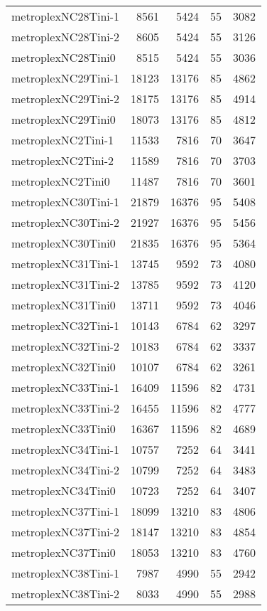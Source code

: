 \begin{tabular}{lrrrr}
metroplexNC28Tini-1 & 8561 & 5424 & 55 & 3082 \\
metroplexNC28Tini-2 & 8605 & 5424 & 55 & 3126 \\
metroplexNC28Tini0 & 8515 & 5424 & 55 & 3036 \\
metroplexNC29Tini-1 & 18123 & 13176 & 85 & 4862 \\
metroplexNC29Tini-2 & 18175 & 13176 & 85 & 4914 \\
metroplexNC29Tini0 & 18073 & 13176 & 85 & 4812 \\
metroplexNC2Tini-1 & 11533 & 7816 & 70 & 3647 \\
metroplexNC2Tini-2 & 11589 & 7816 & 70 & 3703 \\
metroplexNC2Tini0 & 11487 & 7816 & 70 & 3601 \\
metroplexNC30Tini-1 & 21879 & 16376 & 95 & 5408 \\
metroplexNC30Tini-2 & 21927 & 16376 & 95 & 5456 \\
metroplexNC30Tini0 & 21835 & 16376 & 95 & 5364 \\
metroplexNC31Tini-1 & 13745 & 9592 & 73 & 4080 \\
metroplexNC31Tini-2 & 13785 & 9592 & 73 & 4120 \\
metroplexNC31Tini0 & 13711 & 9592 & 73 & 4046 \\
metroplexNC32Tini-1 & 10143 & 6784 & 62 & 3297 \\
metroplexNC32Tini-2 & 10183 & 6784 & 62 & 3337 \\
metroplexNC32Tini0 & 10107 & 6784 & 62 & 3261 \\
metroplexNC33Tini-1 & 16409 & 11596 & 82 & 4731 \\
metroplexNC33Tini-2 & 16455 & 11596 & 82 & 4777 \\
metroplexNC33Tini0 & 16367 & 11596 & 82 & 4689 \\
metroplexNC34Tini-1 & 10757 & 7252 & 64 & 3441 \\
metroplexNC34Tini-2 & 10799 & 7252 & 64 & 3483 \\
metroplexNC34Tini0 & 10723 & 7252 & 64 & 3407 \\
metroplexNC37Tini-1 & 18099 & 13210 & 83 & 4806 \\
metroplexNC37Tini-2 & 18147 & 13210 & 83 & 4854 \\
metroplexNC37Tini0 & 18053 & 13210 & 83 & 4760 \\
metroplexNC38Tini-1 & 7987 & 4990 & 55 & 2942 \\
metroplexNC38Tini-2 & 8033 & 4990 & 55 & 2988 \\

\end{tabular}
